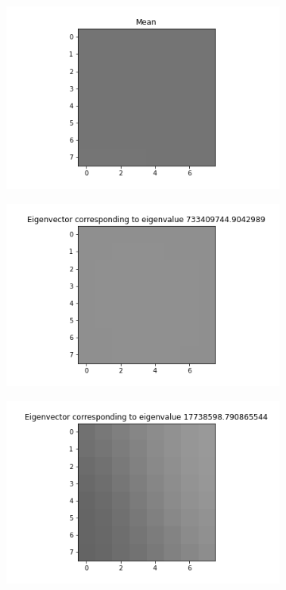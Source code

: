 \documentclass{article}
\begin{document}
\begin{figure}[h]
    \begin{subfigure}{0.2\linewidth}
        \centering
    \end{subfigure}
    \hfill
    \begin{subfigure}{0.2\linewidth}
        \centering
        \includegraphics[scale=0.2]{images/q4/donald/mean.png}
    \end{subfigure}
    \hfill
    \begin{subfigure}{0.2\linewidth}
        \centering
    \end{subfigure}
    \newline
    \begin{subfigure}{0.2\linewidth}
        \centering
        \includegraphics[scale=0.2]{images/q4/donald/eigenvector0.png}
    \end{subfigure}
    \hfill
    \begin{subfigure}{0.2\linewidth}
        \centering
        \includegraphics[scale=0.2]{images/q4/donald/eigenvector1.png}

\end{subfigure}
\end{figure}
\end{document}
